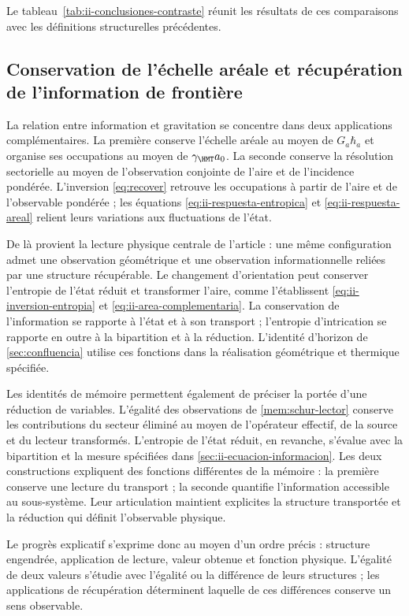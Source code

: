 Le tableau~\ref{tab:ii-conclusiones-contraste} réunit les résultats de
ces comparaisons avec les définitions structurelles précédentes.


\subsection{Conservation de l’échelle aréale et récupération de l’information de frontière}

La relation entre information et gravitation se concentre dans deux applications
complémentaires. La première conserve l’échelle aréale au moyen de
$G_a\hbar_a$ et organise ses occupations au moyen de
$\gamma_{\HMT}a_0$. La seconde conserve la résolution sectorielle au moyen de
l’observation conjointe de l’aire et de l’incidence pondérée. L’inversion
\eqref{eq:recover} retrouve les occupations à partir de l’aire et de
l’observable pondérée ; les équations
\eqref{eq:ii-respuesta-entropica} et \eqref{eq:ii-respuesta-areal}
relient leurs variations aux fluctuations de l’état.

De là provient la lecture physique centrale de l’article : une même
configuration admet une observation géométrique et une observation
informationnelle reliées par une structure récupérable. Le changement
d’orientation peut conserver l’entropie de l’état réduit et
transformer l’aire, comme l’établissent
\eqref{eq:ii-inversion-entropia} et \eqref{eq:ii-area-complementaria}.
La conservation de l’information se rapporte à l’état et à son transport ;
l’entropie d’intrication se rapporte en outre à la bipartition et à
la réduction. L’identité d’horizon de
\ref{sec:confluencia} utilise ces fonctions dans la réalisation
géométrique et thermique spécifiée.

Les identités de mémoire permettent également de préciser la portée d’une
réduction de variables. L’égalité des observations de
\eqref{mem:schur-lector} conserve les contributions du secteur éliminé
au moyen de l’opérateur effectif, de la source et du lecteur transformés.
L’entropie de l’état réduit, en revanche, s’évalue avec la bipartition
et la mesure spécifiées dans \ref{sec:ii-ecuacion-informacion}.
Les deux constructions expliquent des fonctions différentes de la mémoire :
la première conserve une lecture du transport ; la seconde quantifie
l’information accessible au sous-système. Leur articulation maintient
explicites la structure transportée et la réduction qui définit
l’observable physique.

Le progrès explicatif s’exprime donc au moyen d’un ordre précis :
structure engendrée, application de lecture, valeur obtenue et fonction
physique. L’égalité de deux valeurs s’étudie avec l’égalité
ou la différence de leurs structures ; les applications de récupération déterminent
laquelle de ces différences conserve un sens observable.
